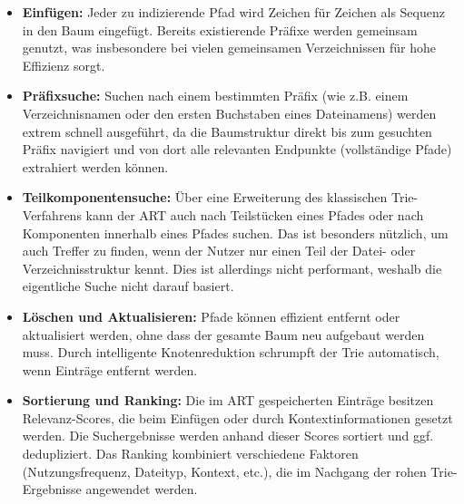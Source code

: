\begin{itemize} 
  \item \textbf{Einfügen:} Jeder zu indizierende Pfad wird Zeichen für Zeichen als Sequenz in den Baum eingefügt.
      Bereits existierende Präfixe werden gemeinsam genutzt, was insbesondere bei vielen gemeinsamen Verzeichnissen für hohe
      Effizienz sorgt.

  \item \textbf{Präfixsuche:} Suchen nach einem bestimmten Präfix (wie z.B. einem Verzeichnisnamen oder den ersten Buchstaben
    eines Dateinamens) werden extrem schnell ausgeführt, da die Baumstruktur direkt bis zum gesuchten Präfix navigiert und von
    dort alle relevanten Endpunkte (vollständige Pfade) extrahiert werden können.

  \item \textbf{Teilkomponentensuche:} Über eine Erweiterung des klassischen Trie-Verfahrens kann der ART auch nach Teilstücken
    eines Pfades oder nach Komponenten innerhalb eines Pfades suchen. Das ist besonders nützlich, um auch Treffer zu finden, wenn
    der Nutzer nur einen Teil der Datei- oder Verzeichnisstruktur kennt. Dies ist allerdings nicht performant, weshalb die
    eigentliche Suche nicht darauf basiert.

  \item \textbf{Löschen und Aktualisieren:} Pfade können effizient entfernt oder aktualisiert werden, ohne dass der gesamte Baum
    neu aufgebaut werden muss. Durch intelligente Knotenreduktion schrumpft der Trie automatisch, wenn Einträge entfernt werden.

  \item \textbf{Sortierung und Ranking:} Die im ART gespeicherten Einträge besitzen Relevanz-Scores, die beim Einfügen oder durch
    Kontextinformationen gesetzt werden. Die Suchergebnisse werden anhand dieser Scores sortiert und ggf. dedupliziert. Das
    Ranking kombiniert verschiedene Faktoren (Nutzungsfrequenz, Dateityp, Kontext, etc.), die im Nachgang der rohen
    Trie-Ergebnisse angewendet werden.
\end{itemize}

